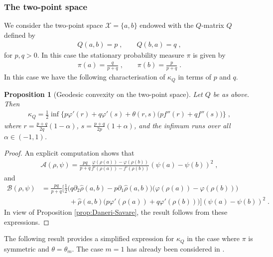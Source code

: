 \documentclass[a4paper,11pt,reqno]{amsart}
\theoremstyle{plain}
\newtheorem{proposition}[theorem]{Proposition}
\theoremstyle{remark}
\numberwithin{equation}{section}
\begin{document}
\subsubsection{The two-point space}
We consider the two-point space ${\mathcal{X}} = \{a, b\}$ endowed with the
$Q$-matrix $Q$ defined by
\begin{align*}
Q(a,b) = p\;,
\qquad  Q(b,a) = q\;,
\end{align*}
for $p, q > 0$. In this case the stationary probability measure $\pi$
is given by
\begin{align*}
 \pi(a)  = \frac{q}{p+q}\;, \qquad \pi(b)  = \frac{p}{p+q}\;.
\end{align*}
In this case we have the following characterisation of $\kappa_Q$ in
terms of $p$ and $q$.

\begin{proposition}[Geodesic convexity on the two-point
  space]\label{prop:2pt-convexity}
  Let $Q$ be as above. Then
\begin{align*}
 \kappa_Q =  \frac12 \inf \bigg\{
 p {\varphi}'(r) + q {\varphi}'(s) + \theta(r,s) \big(p f''(r) + q f''(s)\big)
 \bigg\}\;,
\end{align*}
where $r = \frac{p+q}{2q}(1-\alpha)$, $s = \frac{p+q}{2p}(1+\alpha)$,
and the infimum runs over all $\alpha \in (-1,1)$.
\end{proposition}

\begin{proof}
An explicit computation shows that
\begin{align*}
 {\mathcal{A}}(\rho, \psi)
    = \frac{pq}{p+q} 
     \frac{{\varphi}(\rho(a)) - {\varphi}(\rho(b))}{f'(\rho(a)) - f'(\rho(b))}
     (\psi(a) - \psi(b))^2\;,
\end{align*}
and
\begin{align*}
{\mathcal{B}}(\rho, \psi)
&  =\frac{pq}{p+q} \bigg[  \frac12  
    \Big( q \partial_2 {\hat\rho}(a,b) - p \partial_1 {\hat\rho}(a,b) \Big)
    \Big( {\varphi}(\rho(a)) - {\varphi}(\rho(b)) \Big)
\\&  \qquad\qquad+
   {\hat\rho}(a,b)
    \Big( p {\varphi}'(\rho(a)) + q {\varphi}'(\rho(b)) \Big)\bigg]
    ( \psi(a) - \psi(b))^2\;.
\end{align*}
In view of Proposition \ref{prop:Daneri-Savare}, the result follows
from these expressions.
\end{proof}

The following result provides a simplified expression for $\kappa_Q$
in the case where $\pi$ is symmetric and $\theta = \theta_m$.  The
case $m=1$ has already been considered in \cite[Proposition
2.12]{Ma11}.
\end{document}
